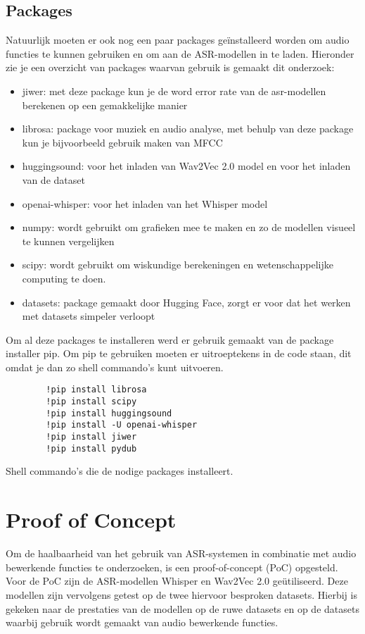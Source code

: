\subsection{Packages}
Natuurlijk moeten er ook nog een paar packages geïnstalleerd worden om audio functies te kunnen gebruiken en om aan de ASR-modellen in te laden. Hieronder zie je een overzicht van packages waarvan gebruik is gemaakt dit onderzoek: 
\begin{itemize}
    \item jiwer: met deze package kun je de word error rate van de asr-modellen berekenen op een gemakkelijke manier
    \item librosa:  package voor muziek en audio analyse, met behulp van deze package kun je bijvoorbeeld gebruik maken van MFCC   
    \item huggingsound: voor het inladen van Wav2Vec 2.0 model en voor het inladen van de dataset
    \item openai-whisper: voor het inladen van het Whisper model    
    \item numpy: wordt gebruikt om grafieken mee te maken en zo de modellen visueel te kunnen vergelijken 
    \item scipy: wordt gebruikt om wiskundige berekeningen en wetenschappelijke computing te doen.
    \item datasets: package gemaakt door Hugging Face, zorgt er voor dat het werken met datasets simpeler verloopt
\end{itemize}

Om al deze packages te installeren werd er gebruik gemaakt van de package installer pip. Om pip te gebruiken moeten er uitroeptekens in de code staan, dit omdat je dan zo shell commando's kunt uitvoeren.

\begin{listing}[H]
    \begin{verbatim}
        !pip install librosa
        !pip install scipy
        !pip install huggingsound
        !pip install -U openai-whisper
        !pip install jiwer
        !pip install pydub
    \end{verbatim}
\caption{Shell commando's die de nodige packages installeert.}
\end{listing}

\section{Proof of Concept}
Om de haalbaarheid van het gebruik van ASR-systemen in combinatie met audio bewerkende functies te onderzoeken, is een proof-of-concept (PoC) opgesteld. Voor de PoC zijn de ASR-modellen Whisper en Wav2Vec 2.0 geütiliseerd. Deze modellen zijn vervolgens getest op de twee hiervoor besproken datasets. Hierbij is gekeken naar de prestaties van de modellen op de ruwe datasets en op de datasets waarbij gebruik wordt gemaakt van audio bewerkende functies.\\


